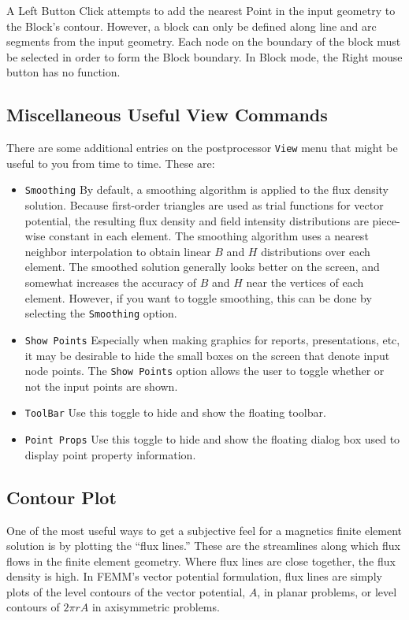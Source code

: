 \documentclass[12pt]{report}
\begin{document}
A Left Button Click attempts to add the nearest Point in the input
geometry to the Block's contour.  However, a block can only be
defined along line and arc segments from the input geometry.  Each
node on the boundary of the block must be selected in order to form
the Block boundary.  In Block mode, the Right mouse button has no
function.

\subsection{Miscellaneous Useful View Commands} \label{scissors}

There are some additional entries on the postprocessor {\tt View}
menu that might be useful to you from time to time.  These are:
\begin{itemize}
\item {\tt Smoothing} By default, a smoothing algorithm is applied
to the flux density solution.  Because first-order triangles are
used as trial functions for vector potential, the resulting flux
density and field intensity distributions are piece-wise constant
in each element.  The smoothing algorithm uses a nearest neighbor
interpolation to obtain linear $B$ and $H$ distributions over each
element.  The smoothed solution generally looks better on the
screen, and somewhat increases the accuracy of $B$ and $H$ near the
vertices of each element.  However, if you want to toggle
smoothing, this can be done by selecting the {\tt Smoothing}
option.
\item {\tt Show Points}  Especially when making graphics for
reports, presentations, etc, it may be desirable to hide the small
boxes on the screen that denote input node points.  The {\tt Show
Points} option allows the user to toggle whether or not the input
points are shown.
\item {\tt ToolBar} Use this toggle to hide and show the floating
toolbar.
\item {\tt Point Props} Use this toggle to hide and show the
floating dialog box used to display point property information.
\end{itemize}


\subsection{Contour Plot}

One of the most useful ways to get a subjective feel for a
magnetics finite element solution is by plotting the ``flux
lines.''  These are the streamlines along which flux flows in the
finite element geometry.  Where flux lines are close together, the
flux density is high.  In FEMM's vector potential formulation, flux
lines are simply plots of the level contours of the vector
potential, $A$, in planar problems, or level contours of $2
\pi r A$ in axisymmetric problems.
\end{document}
